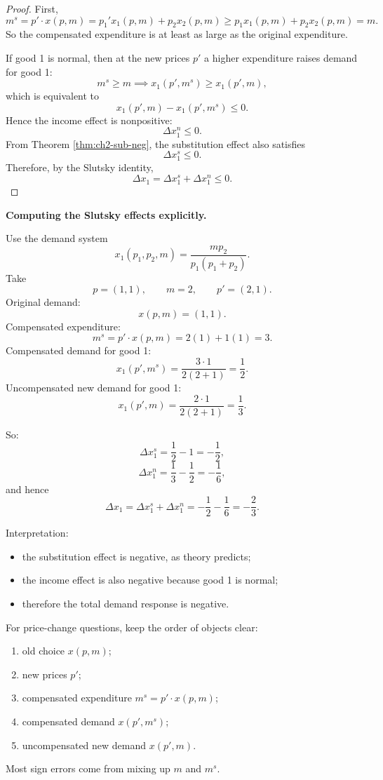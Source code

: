 \begin{proof}
First,
\[
m^s = p' \cdot x(p,m)
= p_1' x_1(p,m) + p_2 x_2(p,m)
\ge
p_1 x_1(p,m) + p_2 x_2(p,m)
= m.
\]
So the compensated expenditure is at least as large as the original expenditure.

If good 1 is normal, then at the new prices $p'$ a higher expenditure raises demand for good 1:
\[
m^s \ge m
\implies
x_1(p',m^s) \ge x_1(p',m),
\]
which is equivalent to
\[
x_1(p',m) - x_1(p',m^s) \le 0.
\]
Hence the income effect is nonpositive:
\[
\Delta x_1^n \le 0.
\]
From Theorem \ref{thm:ch2-sub-neg}, the substitution effect also satisfies
\[
\Delta x_1^s \le 0.
\]
Therefore, by the Slutsky identity,
\[
\Delta x_1 = \Delta x_1^s + \Delta x_1^n \le 0.
\]
\end{proof}

\begin{examplebox}
\textbf{Computing the Slutsky effects explicitly.}

Use the demand system
\[
x_1(p_1,p_2,m)=\frac{m p_2}{p_1(p_1+p_2)}.
\]
Take
\[
p=(1,1),\qquad m=2,\qquad p'=(2,1).
\]
Original demand:
\[
x(p,m)=\left(1,1\right).
\]
Compensated expenditure:
\[
m^s = p' \cdot x(p,m)=2(1)+1(1)=3.
\]
Compensated demand for good 1:
\[
x_1(p',m^s)=\frac{3\cdot 1}{2(2+1)}=\frac12.
\]
Uncompensated new demand for good 1:
\[
x_1(p',m)=\frac{2\cdot 1}{2(2+1)}=\frac13.
\]

So:
\[
\Delta x_1^s = \frac12 - 1 = -\frac12,
\]
\[
\Delta x_1^n = \frac13 - \frac12 = -\frac16,
\]
and hence
\[
\Delta x_1
=
\Delta x_1^s + \Delta x_1^n
=
-\frac12 - \frac16
=
-\frac23.
\]

Interpretation:
\begin{itemize}
    \item the substitution effect is negative, as theory predicts;
    \item the income effect is also negative because good 1 is normal;
    \item therefore the total demand response is negative.
\end{itemize}
\end{examplebox}

\begin{examtip}
For price-change questions, keep the order of objects clear:
\begin{enumerate}
    \item old choice $x(p,m)$;
    \item new prices $p'$;
    \item compensated expenditure $m^s = p' \cdot x(p,m)$;
    \item compensated demand $x(p',m^s)$;
    \item uncompensated new demand $x(p',m)$.
\end{enumerate}
Most sign errors come from mixing up $m$ and $m^s$.
\end{examtip}


